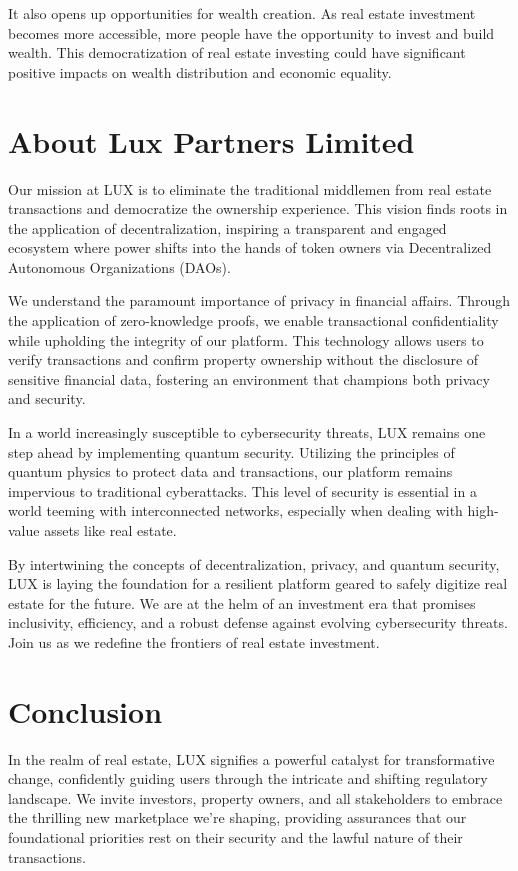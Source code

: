 \documentclass[11pt]{article}
\begin{document}
It also opens up opportunities for wealth creation. As real estate investment becomes more accessible, more people have the opportunity to invest and build wealth. This democratization of real estate investing could have significant positive impacts on wealth distribution and economic equality.


\section{About Lux Partners Limited}

Our mission at LUX is to eliminate the traditional middlemen from real estate transactions and democratize the ownership experience. This vision finds roots in the application of decentralization, inspiring a transparent and engaged ecosystem where power shifts into the hands of token owners via Decentralized Autonomous Organizations (DAOs).


We understand the paramount importance of privacy in financial affairs. Through the application of zero-knowledge proofs, we enable transactional confidentiality while upholding the integrity of our platform. This technology allows users to verify transactions and confirm property ownership without the disclosure of sensitive financial data, fostering an environment that champions both privacy and security.


In a world increasingly susceptible to cybersecurity threats, LUX remains one step ahead by implementing quantum security. Utilizing the principles of quantum physics to protect data and transactions, our platform remains impervious to traditional cyberattacks. This level of security is essential in a world teeming with interconnected networks, especially when dealing with high-value assets like real estate.


By intertwining the concepts of decentralization, privacy, and quantum security, LUX is laying the foundation for a resilient platform geared to safely digitize real estate for the future. We are at the helm of an investment era that promises inclusivity, efficiency, and a robust defense against evolving cybersecurity threats. Join us as we redefine the frontiers of real estate investment.


\section{Conclusion}

In the realm of real estate, LUX signifies a powerful catalyst for transformative change, confidently guiding users through the intricate and shifting regulatory landscape. We invite investors, property owners, and all stakeholders to embrace the thrilling new marketplace we're shaping, providing assurances that our foundational priorities rest on their security and the lawful nature of their transactions.
\end{document}
